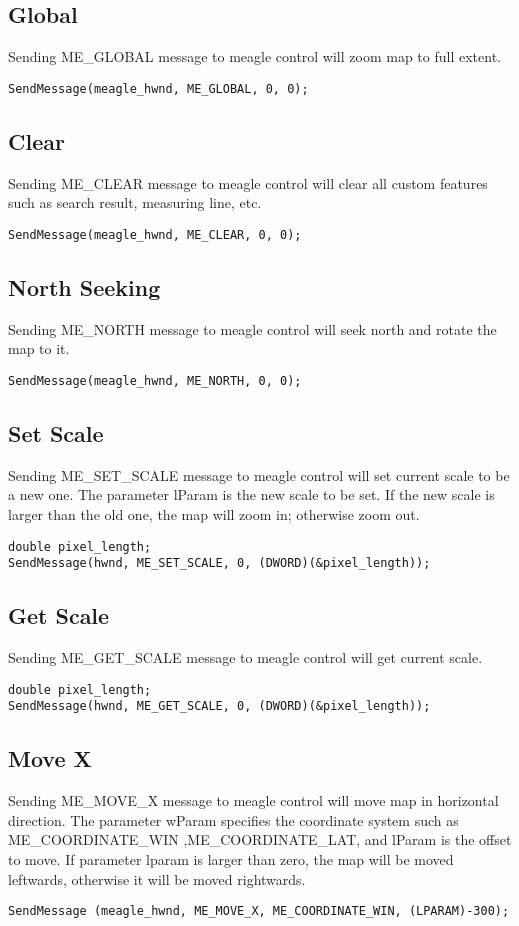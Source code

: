 \documentclass[a4paper]{article}
\begin{document}
\subsection{Global}
Sending ME\_GLOBAL message to meagle control will zoom map to full extent. 
\begin{lstlisting}
SendMessage(meagle_hwnd, ME_GLOBAL, 0, 0);
\end{lstlisting}


\subsection{Clear}
Sending ME\_CLEAR message to meagle control will clear all custom features such as search result, measuring line, etc. 
\begin{lstlisting}
SendMessage(meagle_hwnd, ME_CLEAR, 0, 0);
\end{lstlisting}

\subsection{North Seeking}
Sending ME\_NORTH message to meagle control will seek north and rotate the map to it.
\begin{lstlisting}
SendMessage(meagle_hwnd, ME_NORTH, 0, 0);
\end{lstlisting}

\subsection{Set Scale}
Sending ME\_SET\_SCALE message to meagle control will set current scale to be a new one.  The parameter lParam is the new scale to be set. If the new scale is larger than the old one, the map will zoom in; otherwise zoom out.
\begin{lstlisting}
double pixel_length;
SendMessage(hwnd, ME_SET_SCALE, 0, (DWORD)(&pixel_length));
\end{lstlisting}

\subsection{Get Scale}
Sending ME\_GET\_SCALE message to meagle control will get current scale.
\begin{lstlisting}
double pixel_length;
SendMessage(hwnd, ME_GET_SCALE, 0, (DWORD)(&pixel_length));
\end{lstlisting}

\subsection{Move X}
Sending ME\_MOVE\_X message to meagle control will move map in horizontal direction. The parameter wParam specifies the coordinate system such as ME\_COORDINATE\_WIN ,ME\_COORDINATE\_LAT, and lParam is the offset to move. If parameter lparam is larger than zero, the map will be moved leftwards, otherwise it will be moved rightwards. 
\begin{lstlisting}
SendMessage (meagle_hwnd, ME_MOVE_X, ME_COORDINATE_WIN, (LPARAM)-300);
\end{lstlisting}
\end{document}
